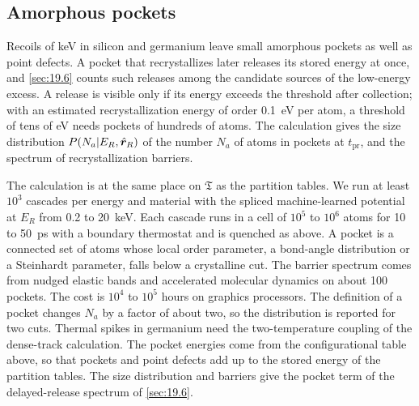 \subsection{Amorphous pockets}

Recoils of keV in silicon and germanium leave small amorphous pockets as well as point defects. A pocket that recrystallizes later releases its stored energy at once, and \cref{sec:19.6} counts such releases among the candidate sources of the low-energy excess. A release is visible only if its energy exceeds the threshold after collection; with an estimated recrystallization energy of order \SI{0.1}{eV} per atom, a threshold of tens of eV needs pockets of hundreds of atoms. The calculation gives the size distribution $P(N_a|E_R, \hat{\bm{r}}_R)$ of the number $N_a$ of atoms in pockets at $t_{\mathrm{pr}}$, and the spectrum of recrystallization barriers.

The calculation is at the same place on $\mathfrak{T}$ as the partition tables. We run at least $10^3$ cascades per energy and material with the spliced machine-learned potential at $E_R$ from 0.2 to \SI{20}{keV}. Each cascade runs in a cell of $10^5$ to $10^6$ atoms for 10 to \SI{50}{ps} with a boundary thermostat and is quenched as above. A pocket is a connected set of atoms whose local order parameter, a bond-angle distribution or a Steinhardt parameter, falls below a crystalline cut. The barrier spectrum comes from nudged elastic bands and accelerated molecular dynamics on about 100 pockets. The cost is $10^4$ to $10^5$ hours on graphics processors. The definition of a pocket changes $N_a$ by a factor of about two, so the distribution is reported for two cuts. Thermal spikes in germanium need the two-temperature coupling of the dense-track calculation. The pocket energies come from the configurational table above, so that pockets and point defects add up to the stored energy of the partition tables. The size distribution and barriers give the pocket term of the delayed-release spectrum of \cref{sec:19.6}.

